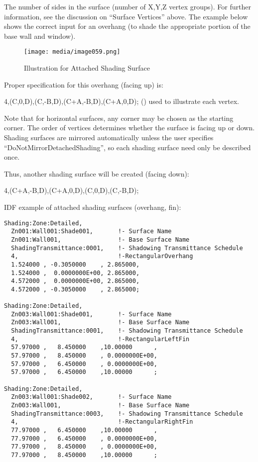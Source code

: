The number of sides in the surface (number of X,Y,Z vertex groups). For further information, see the discussion on ``Surface Vertices'' above. The example below shows the correct input for an overhang (to shade the appropriate portion of the base wall and window).

\begin{figure}[hbtp] %
\centering
\texttt{[image: media/image059.png]}
\caption{Illustration for Attached Shading Surface \protect \label{fig:illustration-for-attached-shading-surface}}
\end{figure}

Proper specification for this overhang (facing up) is:

4,(C,0,D),(C,-B,D),(C+A,-B,D),(C+A,0,D); () used to illustrate each vertex.

\begin{callout}
Note that for horizontal surfaces, any corner may be chosen as the starting corner. The order of vertices determines whether the surface is facing up or down. Shading surfaces are mirrored automatically unless the user specifies ``DoNotMirrorDetachedShading'', so each shading surface need only be described once.
\end{callout}

Thus, another shading surface will be created (facing down):

4,(C+A,-B,D),(C+A,0,D),(C,0,D),(C,-B,D);

IDF example of attached shading surfaces (overhang, fin):

\begin{lstlisting}
Shading:Zone:Detailed,
  Zn001:Wall001:Shade001,       !- Surface Name
  Zn001:Wall001,                !- Base Surface Name
  ShadingTransmittance:0001,    !- Shadowing Transmittance Schedule
  4,                            !-RectangularOverhang
  1.524000 , -0.3050000    , 2.865000,
  1.524000 ,  0.0000000E+00, 2.865000,
  4.572000 ,  0.0000000E+00, 2.865000,
  4.572000 , -0.3050000    , 2.865000;

Shading:Zone:Detailed,
  Zn003:Wall001:Shade001,       !- Surface Name
  Zn003:Wall001,                !- Base Surface Name
  ShadingTransmittance:0001,    !- Shadowing Transmittance Schedule
  4,                            !-RectangularLeftFin
  57.97000 ,   8.450000    ,10.00000      ,
  57.97000 ,   8.450000    , 0.0000000E+00,
  57.97000 ,   6.450000    , 0.0000000E+00,
  57.97000 ,   6.450000    ,10.00000      ;

Shading:Zone:Detailed,
  Zn003:Wall001:Shade002,       !- Surface Name
  Zn003:Wall001,                !- Base Surface Name
  ShadingTransmittance:0003,    !- Shadowing Transmittance Schedule
  4,                            !-RectangularRightFin
  77.97000 ,   6.450000    ,10.00000      ,
  77.97000 ,   6.450000    , 0.0000000E+00,
  77.97000 ,   8.450000    , 0.0000000E+00,
  77.97000 ,   8.450000    ,10.00000      ;
\end{lstlisting}

